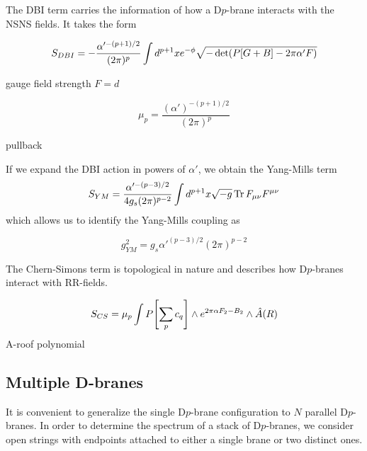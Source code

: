 The DBI term carries the information of how a D$p$-brane interacts with the NSNS fields. 
It takes the form

%

\begin{equation}
  S_{DBI}= -\frac{\alpha'^{-(p+1)/2}}{(2\pi)^p} \int d^{p+1} x e^{-\phi} \sqrt{-\det(P\qty[G+B]-2\pi \alpha'F)}
\end{equation}

gauge field strength $F=d $

\begin{equation}
  \mu_p = \frac{(\alpha')^{-(p+1)/2}}{(2\pi)^p}
\end{equation}

pullback

If we expand the DBI action in powers of $\alpha'$, we obtain the Yang-Mills term
\begin{equation}
  S_{YM} = \frac{\alpha'^{-(p-3)/2}}{4g_s (2\pi)^{p-2}} \int d^{p+1} x \sqrt {-g} \Tr F_{\mu\nu} F^{\mu\nu}
\end{equation}
which allows us to identify the Yang-Mills coupling as 

\begin{equation}
g^2_{YM} = g_s \alpha'^{(p-3)/2}(2\pi)^{p-2}
\end{equation}

The Chern-Simons term is topological in nature and describes how D$p$-branes interact with RR-fields.

\begin{equation}
S_{CS}= \mu_p \int P\qty[\sum_p c_q]\wedge e^{2\pi\alpha F_2 -B_2}\wedge \hat A (R)
\end{equation}
A-roof polynomial

\subsection{Multiple D-branes}

It is convenient to generalize the single D$p$-brane configuration to $N$ parallel D$p$-branes.
In order to determine the spectrum of a stack of D$p$-branes, we consider open strings with endpoints 
attached to either a single brane or two distinct ones.

